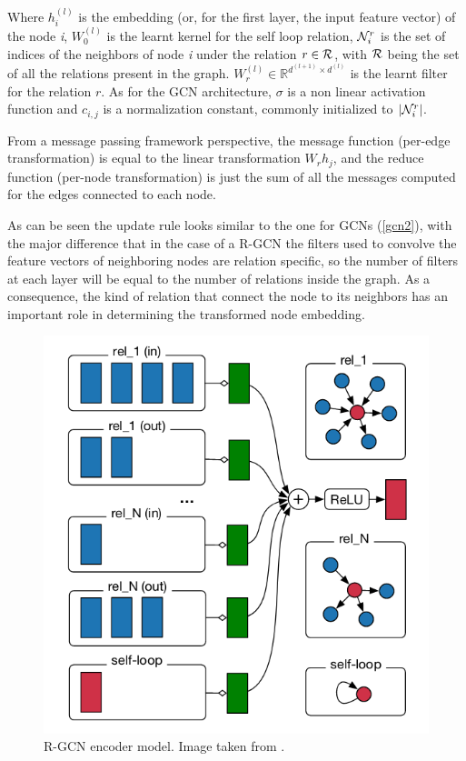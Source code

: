 \documentclass[%
    corpo=13.5pt,
    twoside,
    oldstyle,
    tipotesi=magistrale,
    greek,
    evenboxes
]{toptesi}
\begin{document}
Where $h_i^{(l)}$ is the embedding (or, for the first layer, the input feature
vector) of the node \emph{i}, $W_0^{(l)}$ is the learnt kernel for the
self loop relation, $\CMcal{N}_i^r$ is the
set of indices of the neighbors of node \emph{i} under the relation
$r\in\CMcal{R}$, with $\CMcal{R}$ being the set of all the relations present in
the graph. $W_r^{(l)}\in\mathbb{R}^{d^{(l+1)}\times d^{(l)}}$ is the learnt
filter for the relation $r$. As for the GCN architecture, $\sigma$ is a non
linear activation function and $c_{i,j}$ is a normalization constant, commonly
initialized to $|\CMcal{N}_i^r|$.

From a message passing framework perspective, the message function (per-edge
transformation) is equal to the linear transformation $W_rh_j$, and the reduce
function (per-node transformation) is just the sum of
all the messages computed for the edges connected to each node.

As can be seen the update rule looks similar to the one for GCNs (\ref{gcn2}),
with the major difference that in the case of a R-GCN the filters used to
convolve the feature vectors of neighboring nodes are relation specific, so the
number of filters at each layer will be equal to the number of relations inside
the graph. As a consequence, the kind of relation that connect the node
to its neighbors has an important role in determining the transformed node
embedding.

\begin{figure}[h]
    \centering
    \includegraphics[scale=0.42]{img/rgcn-encoder.png}
    \caption{R-GCN encoder model. Image taken from \cite{schlichtkrull2018}.}
    \label{fig:rgcn-encoder}
\end{figure}
\end{document}
